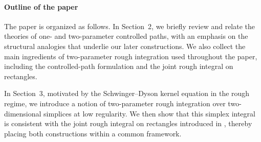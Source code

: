 \documentclass{article}%
\begin{document}

\paragraph{Outline of the paper}
The paper is organized as follows. In Section~2, we briefly review and relate the theories of one- and two-parameter controlled paths, with an emphasis on the structural analogies that underlie our later constructions. We also collect the main ingredients of two-parameter rough integration used throughout the paper, including the controlled-path formulation and the joint rough integral on rectangles.

In Section~3, motivated by the Schwinger--Dyson kernel equation in the rough regime, we introduce a notion of two-parameter rough integration over two-dimensional simplices at low regularity. We then show that this simplex integral is consistent with the joint rough integral on rectangles introduced in \cite{cass2023fubini}, thereby placing both constructions within a common framework.
\end{document}
